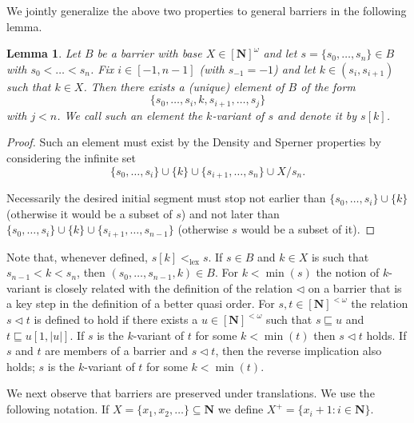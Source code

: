 \documentclass{amsart}
\theoremstyle{plain}
\theoremstyle{plain}
\newtheorem{lemma}[theorem]{Lemma}
\newcommand{\om}{\omega}
\newcommand{\lex}{\mathrm{lex}}
\newcommand\Nat{\mathbf{N}}
\begin{document}
We jointly generalize the above two properties to general barriers in the following lemma. 

\begin{lemma}
    Let $B$ be a barrier with base $X\in [\Nat]^\om$ and let $s = \{s_0,\ldots, s_n\}\in B$ with $s_0<\ldots < s_n$. Fix $i\in [-1,n-1]$ (with $s_{-1}=-1$) and let $k \in (s_{i}, s_{i+1})$ such that $k \in X$.
    Then there exists a (unique) element of $B$ of the form
    $$\{s_0,\ldots, s_i,k, s_{i+1}, \dots, s_j\}$$ 
    with $j < n$. We call such an element the $k$-variant of $s$ and denote it by $s[k]$.
\end{lemma}

\begin{proof} 
Such an element must exist by the Density and Sperner properties by considering the infinite set
$$\{s_0, \dots, s_i\} \cup \{k\} \cup \{s_{i+1}, \dots, s_n\}\cup X/s_n.$$ 

Necessarily the desired initial segment must stop not earlier than $\{s_0, \dots, s_i\}\cup\{k\}$ (otherwise it would be 
a subset of $s$) and not later than $\{s_0, \dots, s_i\}\cup\{k\} \cup \{s_{i+1}, \dots, s_{n-1}\}$ (otherwise $s$ would be a subset of it).
 
\end{proof}

Note that, whenever defined, $s[k] <_\lex s$. If $s \in B$ and $k \in X$ is such that $s_{n-1} < k < s_n$, then $(s_0, \dots, s_{n-1}, k) \in B$. For $k < \min(s)$ the notion of $k$-variant is closely related with the definition of the relation $\lhd$ on a barrier that is a key step in the definition of a better quasi order. For $s, t \in [\Nat]^{<\om}$ the relation $s \lhd t$ is defined to hold if there exists a $u\in [\Nat]^{<\om}$ such that $s \sqsubseteq u$ and $t \sqsubseteq u[1, |u|]$. If $s$ is the $k$-variant of $t$ for some $k < \min(t)$ then $s \lhd t$ holds. If $s$ and $t$ are members of a barrier and $s \lhd t$, then  the reverse implication also holds; $s$ is the $k$-variant of $t$ for some $k < \min(t)$.

We next observe that barriers are preserved under translations. We use the following notation. If $X = \{ x_1, x_2, \ldots\}\subseteq \Nat$ we define $X^+=\{x_i+1  :  i \in \Nat\}$.
\end{document}
